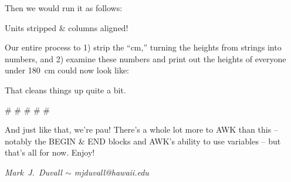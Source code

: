 \documentclass[10pt,a4]{article}
\begin{document}
Then we would run it as follows:

\ttfamily
\colorbox{black}{}

\colorbox{black}{}
\normalfont

Units stripped \& columns aligned!

Our entire process to 1) strip the ``cm,'' turning the heights from strings into numbers, and 2) examine these numbers and print out the heights of everyone under 180~cm could now look like:

\ttfamily
\colorbox{black}{}
\normalfont

That cleans things up quite a bit.


\# \# \# \# \#



And just like that, we're pau! There's a whole lot more to AWK than this -- notably the BEGIN \& END blocks and AWK's ability to use variables -- but that's all for now. Enjoy!


\emph{Mark~J.~Duvall $\sim$ mjduvall@hawaii.edu}



\end{document}
